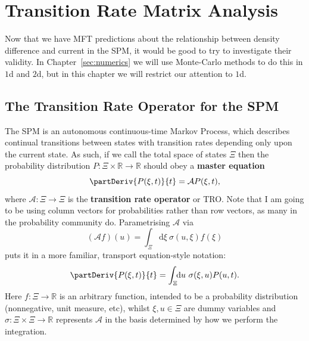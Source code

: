 \chapter{Transition Rate Matrix Analysis} 
\label{sec:transRateChapter}
Now that we have MFT predictions about the relationship between density difference and
current in the SPM, it would be good to try to investigate their validity. In Chapter~\ref{sec:numerics} we will use Monte-Carlo methods to do this in $1$d and $2$d, but in this chapter we will restrict our attention to $1$d.

\section{The Transition Rate Operator for the SPM} \label{sec:TRMGeneralResults}
The SPM is an autonomous continuous-time Markov Process, which describes continual transitions between states
with transition rates depending only upon the current state. As such, if we call the total space of
states $\Xi$ then the probability distribution $P: \Xi \times \mathbb{R} \rightarrow  \mathbb{R}$ should obey a \textbf{master equation}
\begin{equation} \label{eq:masterEq}
 \partDeriv{P(\xi, t)}{t} = \mathcal{A} P(\xi, t),
\end{equation}
where $\mathcal{A}:\Xi \rightarrow \Xi$ is the \textbf{transition rate operator}
or TRO. Note that I am going to be using column vectors for probabilities rather than
row vectors, as many in the probability community do.
Parametrising $\mathcal{A}$ via 
\begin{equation}
 (\mathcal{A}f)(u) = \int_\Xi \! \! \mathrm{d}  \xi \ \sigma (u, \xi) f(\xi)
\end{equation}
puts it in a more familiar, transport equation-style notation:
\begin{equation}
 \partDeriv{P(\xi, t)}{t} = \int_\Xi \! \! \mathrm{d}  u \ \sigma (\xi, u) P(u, t) .
\end{equation}
Here $f: \Xi \rightarrow \mathbb{R}$ is an arbitrary function, intended to be a probability
distribution (nonnegative, unit measure, etc), whilst $\xi , u \in \Xi$ are dummy variables
and $\sigma: \Xi \times \Xi \rightarrow \mathbb{R}$ represents $\mathcal{A}$ in the basis 
determined by how we perform the integration.

